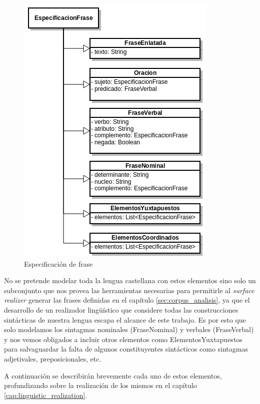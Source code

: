 \begin{figure}[h]
  	\centering
	\includegraphics[scale=0.7]{img/phrase_spec.png}
	\caption{Especificación de frase}
  	\label{fig:phase_spec}
\end{figure}

No se pretende modelar toda la lengua castellana con estos elementos sino solo un subconjunto que nos provea las herramientas necesarias para permitirle al \textit{surface realizer} generar las frases definidas en el capítulo \ref{sec:corpus_analisis}, ya que el desarrollo de un realizador lingüístico que considere todas las construcciones sintácticas de nuestra lengua escapa el alcance de este trabajo. Es por esto que solo modelamos los sintagmas nominales (FraseNominal) y verbales (FraseVerbal) y nos vemos obligados a incluir otros elementos como ElementosYuxtapuestos para salvaguardar la falta de algunos constituyentes sintácticos como sintagmas adjetivales, preposicionales, etc. 

A continuación se describirán brevemente cada uno de estos elementos, profundizando sobre la realización de los mismos en el capítulo \ref{cap:linguistic_realization}.


